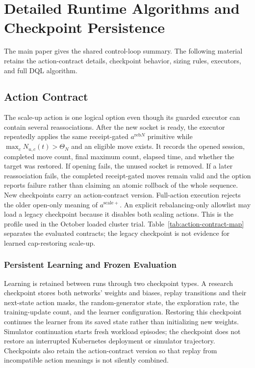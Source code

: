 \section{Detailed Runtime Algorithms and Checkpoint Persistence}
\label{app:runtime-details}
The main paper gives the shared control-loop summary. The following material
retains the action-contract details, checkpoint behavior, sizing rules,
executors, and full DQL algorithm.
\subsection{Action Contract}
The scale-up action is one logical option even though its guarded executor can
contain several reassociations. After the new socket is ready, the executor
repeatedly applies the same receipt-gated $a^{\mathrm{reb}N}$ primitive while
$\max_c N_{u,c}(t)>\Theta_N$ and an eligible move exists. It records the opened
session, completed move count, final maximum count, elapsed time, and whether
the target was restored. If opening fails, the unused socket is removed. If a
later reassociation fails, the completed receipt-gated moves remain valid and
the option reports failure rather than claiming an atomic rollback of the
whole sequence. New checkpoints carry an action-contract version.
Full-action execution rejects the older open-only meaning of
$a^{\mathrm{scale}+}$. An explicit rebalancing-only allowlist may load a legacy
checkpoint because it disables both scaling actions. This is the profile used
in the October loaded cluster trial. Table~\ref{tab:action-contract-map}
separates the evaluated contracts; the legacy checkpoint is not evidence for
learned cap-restoring scale-up.
\subsubsection{Persistent Learning and Frozen Evaluation}
Learning is retained between runs through two checkpoint types. A research
checkpoint stores both networks' weights and biases, replay transitions and
their next-state action masks, the random-generator state, the exploration
rate, the training-update count, and the learner configuration. Restoring this
checkpoint continues the learner from its saved state rather than initializing
new weights. Simulator continuation starts fresh workload episodes; the
checkpoint does not restore an interrupted Kubernetes deployment or simulator
trajectory. Checkpoints also retain the action-contract version so that replay
from incompatible action meanings is not silently combined.

